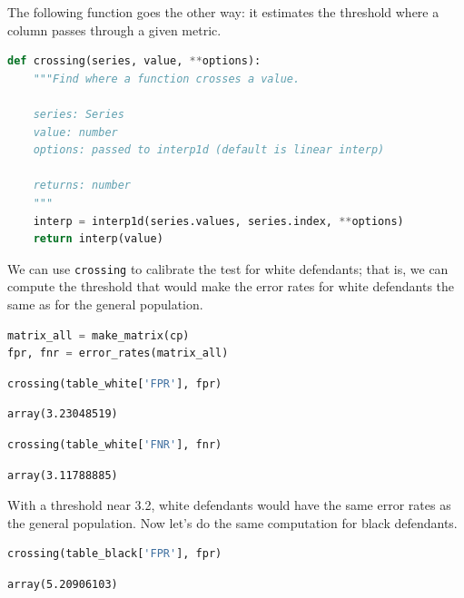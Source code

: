 The following function goes the other way: it estimates the threshold
where a column passes through a given metric.

\begin{lstlisting}[language=Python,style=source]
def crossing(series, value, **options):
    """Find where a function crosses a value.
    
    series: Series
    value: number
    options: passed to interp1d (default is linear interp)
    
    returns: number
    """
    interp = interp1d(series.values, series.index, **options)
    return interp(value)
\end{lstlisting}

We can use \passthrough{\lstinline!crossing!} to calibrate the test for
white defendants; that is, we can compute the threshold that would make
the error rates for white defendants the same as for the general
population.

\begin{lstlisting}[language=Python,style=source]
matrix_all = make_matrix(cp)
fpr, fnr = error_rates(matrix_all)
\end{lstlisting}

\begin{lstlisting}[language=Python,style=source]
crossing(table_white['FPR'], fpr)
\end{lstlisting}

\begin{lstlisting}[style=output]
array(3.23048519)
\end{lstlisting}

\begin{lstlisting}[language=Python,style=source]
crossing(table_white['FNR'], fnr)
\end{lstlisting}

\begin{lstlisting}[style=output]
array(3.11788885)
\end{lstlisting}

With a threshold near 3.2, white defendants would have the same error
rates as the general population. Now let's do the same computation for
black defendants.

\begin{lstlisting}[language=Python,style=source]
crossing(table_black['FPR'], fpr)
\end{lstlisting}

\begin{lstlisting}[style=output]
array(5.20906103)
\end{lstlisting}

